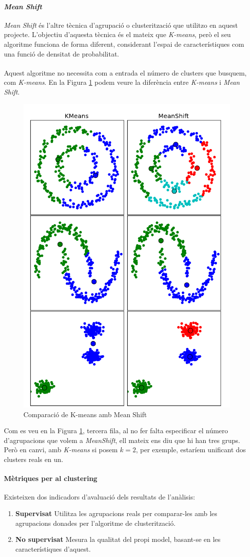 \documentclass[12pt,a4paper,catalan]{article}
\begin{document}
\newpage

\paragraph{\textit{Mean Shift}}
\textit{Mean Shift} \cite{mean-shift} és l'altre tècnica d'agrupació o clusterització que utilitzo en aquest projecte. L'objectiu d'aquesta tècnica és el mateix que \textit{K-means}, però el seu algoritme funciona de forma diferent, considerant l'espai de característiques com una funció de densitat de probabilitat.
\\
\\
Aquest algoritme no necessita com a entrada el número de clusters que busquem, com \textit{K-means}. En la Figura \ref{fig:meanshiftvskmeans} podem veure la diferència entre \textit{K-means} i \textit{Mean Shift}.

\begin{figure}[h]
\centering
\includegraphics[width=.4\linewidth]{img/kmeansVsMeanshift.png}
\caption{Comparació de K-means amb Mean Shift \cite{comp-meanshift-kmeans}}
\label{fig:meanshiftvskmeans}
\end{figure}

Com es veu en la Figura \ref{fig:meanshiftvskmeans}, tercera fila, al no fer falta especificar el número d'agrupacions que volem a \textit{MeanShift}, ell mateix ens diu que hi han tres grups. Però en canvi, amb \textit{K-means} si posem $k=2$, per exemple, estaríem unificant dos clusters reals en un.

\newpage

\paragraph{Mètriques per al clustering}
Existeixen dos indicadors d'avaluació dels resultats de l'anàlisis:
\begin{enumerate}
	\item \textbf{Supervisat} Utilitza les agrupacions reals per comparar-les amb les agrupacions donades per l'algoritme de clusterització.
	\item \textbf{No supervisat} Mesura la qualitat del propi model, basant-se en les característiques d'aquest.
\end{enumerate}
\end{document}
